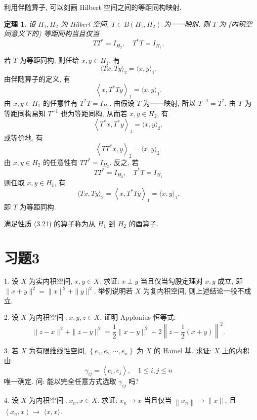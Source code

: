 \documentclass[openany]{ctexbook}
\makeatletter
\theoremstyle{kaiti}
\newtheorem{theorem}{定理}[section]
\theoremstyle{normal}
\renewenvironment{proof}[1][\proofname]{\par
    \pushQED{\qed}%
    \normalfont \topsep6\p@\@plus6\p@\relax
    \trivlist
    \item\relax
    {\heiti #1}\hspace{2\labelsep}\ignorespaces
  }{%
    \popQED\endtrivlist\@endpefalse
  }
\makeatother
\begin{document}
利用伴随算子, 可以刻画 Hilbert 空间之间的等距同构映射.

\begin{theorem}
设 $H_1, H_2$ 为 Hilbert 空间, $T \in B\left(H_1, H_2\right)$ 为一一映射. 则 $T$ 为 (内积空间意义下的) 等距同构当且仅当
\begin{equation}
  T T^{*}=I_{H_2},\quad T^{*} T=I_{H_1}.
\end{equation}
\end{theorem}

\begin{proof}
若 $T$ 为等距同构, 则任给 $x, y \in H_1$, 有
$$
\langle T x, T y\rangle_2=\langle x, y\rangle_1.
$$
由伴随算子的定义, 有
$$
\left\langle x, T^{*} T y\right\rangle_1=\langle x, y\rangle_1.
$$
由 $x, y \in H_1$ 的任意性有 $T^{*} T=I_{H_1}$. 由假设 $T$ 为一一映射, 所以 $T^{-1}=T^{*}$. 由 $T$ 为等距同构易知 $T^{-1}$ 也为等距同构, 从而若 $x, y \in H_2$, 有
$$
\left\langle T^{*} x, T^{*} y\right\rangle_1=\langle x, y\rangle_2,
$$
或等价地, 有
$$
\left\langle T T^{*} x, y\right\rangle_2=\langle x, y\rangle_2.
$$
由 $x, y \in H_2$ 的任意性有 $T T^{*}=I_{H_2}$.
反之, 若
$$
T T^{*}=I_{H_2},\quad T^{*} T=I_{H_1}
$$
则任取 $x, y \in H_1$, 有
$$
\langle T x, T y\rangle_2=\left\langle x, T^{*} T y\right\rangle_1=\langle x, y\rangle_1.
$$
即 $T$ 为等距同构.
\end{proof}

满足性质 (3.21) 的算子称为从 $H_1$ 到 $H_2$ 的酉算子.

\section*{习题3}

1. 设 $X$ 为实内积空间, $x, y \in X$. 求证: $x \perp y$ 当且仅当勾股定理对 $x, y$ 成立, 即 $\|x+y\|^2=\|x\|^2+\|y\|^2$. 举例说明若 $X$ 为复内积空间, 则上述结论一般不成立.

2. 设 $X$ 为内积空间 $, x, y, z \in X$. 证明 Applonius 恒等式:
$$
\|z-x\|^2+\|z-y\|^2=\frac{1}{2}\|x-y\|^2+2\left\|z-\frac{1}{2}(x+y)\right\|^2.
$$

3. 若 $X$ 为有限维线性空间, $\left\{e_1, e_2, \cdots, e_n\right\}$ 为 $X$ 的 Hamel 基. 求证: $X$ 上的内积由
$$
\gamma_{i j}=\left\langle e_{i}, e_{j}\right\rangle, \quad 1 \leqslant i, j \leqslant n
$$
唯一确定. 问: 能以完全任意方式选取 $\gamma_{i j}$ 吗?

4. 设 $X$ 为内积空间 $, x_n, x \in X$. 求证: $x_n \rightarrow x$ 当且仅当 $\left\|x_n\right\| \rightarrow\|x\|$, 且 $\left\langle x_n, x\right\rangle \rightarrow$ $\langle x, x\rangle$.
\end{document}
